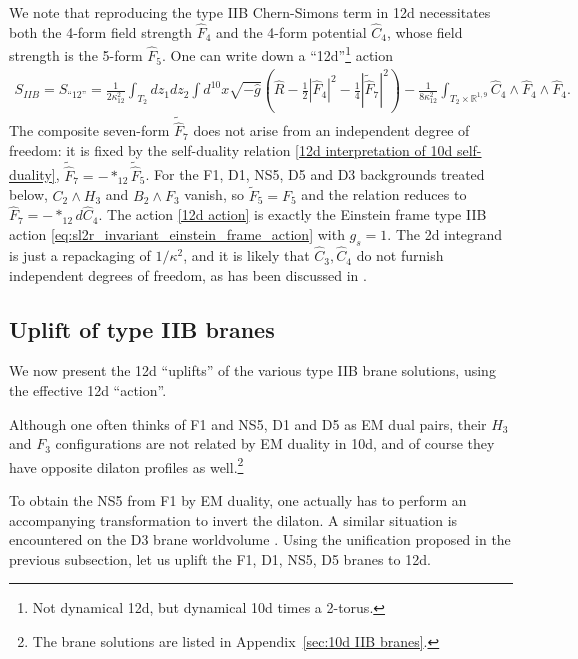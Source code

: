 We note that reproducing the type IIB Chern-Simons term in 12d necessitates both the 4-form field strength $\widehat F_4$ and the 4-form potential $\widehat C_4$, whose field strength is the 5-form $\widehat F_5$.
One can write down a ``12d''\footnote{
Not dynamical 12d, but dynamical 10d times a 2-torus.
}
action
\begin{equation}
\begin{aligned}
S_{IIB}=
S_{\text{``12''}}
= \frac{1}{2\kappa_{12}^2}\int_{T_2}dz_1 dz_2\int d^{10}x
\sqrt{-\widehat{g}}
\left(
\widehat{R} - \frac{1}{2}|\widehat F_4|^2-\frac{1}{4}|\widetilde{\widehat{F}}_7|^2
\right)-\frac{1}{8\kappa_{12}^2}\int_{T_2\times \mathbb{R}^{1,9}}\widehat{C}_4\wedge \widehat{F}_4\wedge \widehat{F}_4.
\end{aligned}
\label{12d action}
\end{equation}
The composite seven-form $\widetilde{\widehat{F}}_7$ does not arise from an independent degree of freedom: it is fixed by the self-duality relation \eqref{12d interpretation of 10d self-duality}, $\widetilde{\widehat{F}}_7 = -*_{12}\widetilde{\widehat{F}}_5$. 
For the F1, D1, NS5, D5 and D3 backgrounds treated below, $C_2\wedge H_3$ and $B_2\wedge F_3$ vanish, so $\tilde F_5 = F_5$ and the relation reduces to $\widehat F_7 = -*_{12}d\widehat C_4$.
The action \eqref{12d action} is exactly the Einstein frame type IIB action \eqref{eq:sl2r_invariant_einstein_frame_action} with $g_s=1$.
The 2d integrand is just a repackaging of $1/\kappa^2$, and it is likely that $\widehat C_3, \widehat C_4$ do not furnish independent degrees of freedom, as has been discussed in \cite{Tseytlin:1996ne}.

\subsection{Uplift of type IIB branes}
We now present the 12d ``uplifts'' of the various type IIB brane solutions, using the effective 12d ``action''.

Although one often thinks of F1 and NS5, D1 and D5 as EM dual pairs, their $H_3$ and $F_3$ configurations are not related by EM duality in 10d, and of course they have opposite dilaton profiles as well.\footnote{The brane solutions are listed in Appendix~\ref{sec:10d IIB branes}.}

To obtain the NS5 from F1 by EM duality, one actually has to perform an accompanying \SLZ{} transformation to invert the dilaton.
A similar situation is encountered on the D3 brane worldvolume \cite{Tseytlin:1996it}.
Using the unification proposed in the previous subsection, let us uplift the F1, D1, NS5, D5 branes to 12d.

